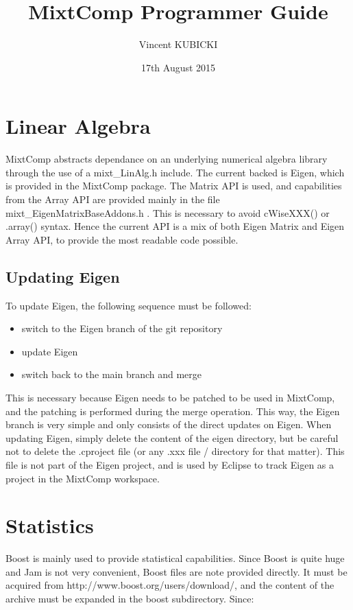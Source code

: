 \documentclass{article}
\title{MixtComp Programmer Guide}
\author{Vincent KUBICKI}
\date{17th August 2015}
\begin{document}
\maketitle

\section{Linear Algebra}

MixtComp abstracts dependance on an underlying numerical algebra library through the use of a mixt_LinAlg.h include. The current backed is Eigen, which is provided in the MixtComp package. The Matrix API is used, and capabilities from the Array API are provided mainly in the file mixt_EigenMatrixBaseAddons.h . This is necessary to avoid cWiseXXX() or .array() syntax. Hence the current API is a mix of both Eigen Matrix and Eigen Array API, to provide the most readable code possible.

\subsection{Updating Eigen}

To update Eigen, the following sequence must be followed:

\begin{itemize}
\item switch to the Eigen branch of the git repository
\item update Eigen
\item switch back to the main branch and merge
\end{itemize}

This is necessary because Eigen needs to be patched to be used in MixtComp, and the patching is performed during the merge operation. This way, the Eigen branch is very simple and only consists of the direct updates on Eigen. When updating Eigen, simply delete the content of the eigen directory, but be careful not to delete the .cproject file (or any .xxx file / directory for that matter). This file is not part of the Eigen project, and is used by Eclipse to track Eigen as a project in the MixtComp workspace.

\section{Statistics}

Boost is mainly used to provide statistical capabilities. Since Boost is quite huge and Jam is not very convenient, Boost files are note provided directly. It must be acquired from http://www.boost.org/users/download/, and the content of the archive must be expanded in the boost subdirectory. Since:
\end{document}
